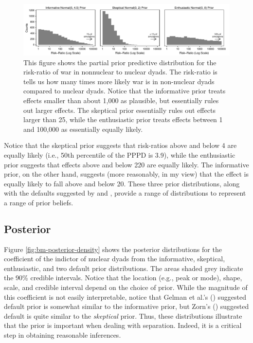 \documentclass[12pt]{article}
\begin{document}
\begin{figure}[H]
\begin{center}
\includegraphics[scale = .8]{figs/bm-pppd-hist.pdf}
\caption{This figure shows the partial prior predictive distribution for the risk-ratio of war in nonnuclear to nuclear dyads. 
The risk-ratio is tells us how many times more likely war is in non-nuclear dyads compared to nuclear dyads. 
Notice that the informative prior treats effects smaller than about 1,000 as plausible, but essentially rules out larger effects. 
The skeptical prior essentially rules out effects larger than 25, while the enthusiastic prior treats effects between 1 and 100,000 as essentially equally likely.}\label{fig:bm-pppd-hist}
\end{center}
\end{figure}



Notice that the skeptical prior suggests that risk-ratios above and below 4 are equally likely (i.e., 50th percentile of the PPPD is 3.9), while the enthusiastic prior suggests that effects above and below 220 are equally likely. 
The informative prior, on the other hand, suggests (more reasonably, in my view) that the effect is equally likely to fall above and below 20. 
These three prior distributions, along with the defaults suggested by \cite{Zorn2005} and \cite{Gelmanetal2008}, provide a range of distributions to represent a range of prior beliefs.

\subsection*{Posterior}

Figure \ref{fig:bm-posterior-density} shows the posterior distributions for the coefficient of the indictor of nuclear dyads from the informative, skeptical, enthusiastic, and two default prior distributions. 
The areas shaded grey indicate the 90\% credible intervals. Notice that the location (e.g., peak or mode), shape, scale, and credible interval depend on the choice of prior. 
While the magnitude of this coefficient is not easily interpretable, notice that Gelman et al.'s (\citeyear{Gelmanetal2008}) suggested default prior is somewhat similar to the informative prior, but Zorn's (\citeyear{Zorn2005}) suggested default is quite similar to the \emph{skeptical} prior. 
Thus, these distributions illustrate that the prior is important when dealing with separation. 
Indeed, it is a critical step in obtaining reasonable inferences.
\end{document}
